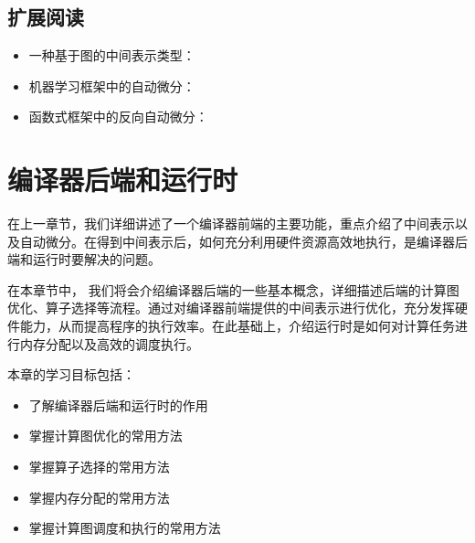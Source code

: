 \documentclass[letterpaper,10pt,english]{sphinxmanual}
\begin{document}
\section{扩展阅读}
\label{\detokenize{chapter_frontend_and_ir/summary:id2}}\begin{itemize}
\item {} 
\sphinxAtStartPar
一种基于图的中间表示类型：
%
\begin{footnote}[15]\sphinxAtStartFootnote
{}
%
\end{footnote}

\item {} 
\sphinxAtStartPar
机器学习框架中的自动微分：
%
\begin{footnote}[16]\sphinxAtStartFootnote
{}
%
\end{footnote}

\item {} 
\sphinxAtStartPar
函数式框架中的反向自动微分：
%
\begin{footnote}[17]\sphinxAtStartFootnote
{}
%
\end{footnote}

\end{itemize}


\chapter{编译器后端和运行时}
\label{\detokenize{chapter_backend_and_runtime/index:id1}}\label{\detokenize{chapter_backend_and_runtime/index::doc}}
\sphinxAtStartPar
在上一章节，我们详细讲述了一个编译器前端的主要功能，重点介绍了中间表示以及自动微分。在得到中间表示后，如何充分利用硬件资源高效地执行，是编译器后端和运行时要解决的问题。

\sphinxAtStartPar
在本章节中，
我们将会介绍编译器后端的一些基本概念，详细描述后端的计算图优化、算子选择等流程。通过对编译器前端提供的中间表示进行优化，充分发挥硬件能力，从而提高程序的执行效率。在此基础上，介绍运行时是如何对计算任务进行内存分配以及高效的调度执行。

\sphinxAtStartPar
本章的学习目标包括：
\begin{itemize}
\item {} 
\sphinxAtStartPar
了解编译器后端和运行时的作用

\item {} 
\sphinxAtStartPar
掌握计算图优化的常用方法

\item {} 
\sphinxAtStartPar
掌握算子选择的常用方法

\item {} 
\sphinxAtStartPar
掌握内存分配的常用方法

\item {} 
\sphinxAtStartPar
掌握计算图调度和执行的常用方法

\end{itemize}
\end{document}
